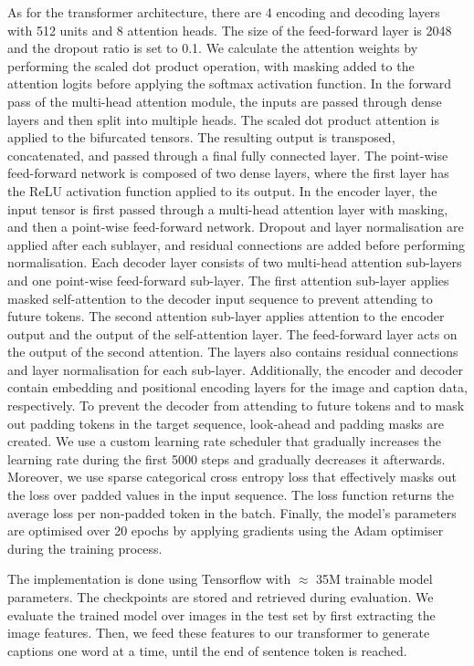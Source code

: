 As for the transformer architecture, there are 4 encoding and decoding layers with 512 units and 8 attention heads. The size of the feed-forward layer is 2048 and the dropout ratio is set to 0.1. We calculate the attention weights by performing the scaled dot product operation, with masking added to the attention logits before applying the softmax activation function. In the forward pass of the multi-head attention module, the inputs are passed through dense layers and then split into multiple heads. The scaled dot product attention is applied to the bifurcated tensors. The resulting output is transposed, concatenated, and passed through a final fully connected layer. The point-wise feed-forward network is composed of two dense layers, where the first layer has the ReLU activation function applied to its output. In the encoder layer, the input tensor is first passed through a multi-head attention layer with masking, and then a point-wise feed-forward network. Dropout and layer normalisation are applied after each sublayer, and residual connections are added before performing normalisation. Each decoder layer consists of two multi-head attention sub-layers and one point-wise feed-forward sub-layer. The first attention sub-layer applies masked self-attention to the decoder input sequence to prevent attending to future tokens. The second attention sub-layer applies attention to the encoder output and the output of the self-attention layer. The feed-forward layer acts on the output of the second attention. The layers also contains residual connections and layer normalisation for each sub-layer. Additionally, the encoder and decoder contain embedding and positional encoding layers for the image and caption data, respectively. To prevent the decoder from attending to future tokens and to mask out padding tokens in the target sequence, look-ahead and padding masks are created. We use a custom learning rate scheduler that gradually increases the learning rate during the first 5000 steps and gradually decreases it afterwards. Moreover, we use sparse categorical cross entropy loss that effectively masks out the loss over padded values in the input sequence. The loss function returns the average loss per non-padded token in the batch. Finally, the model's parameters are optimised over 20 epochs by applying gradients using the Adam optimiser during the training process.

The implementation is done using Tensorflow with $\approx$ 35M trainable model parameters. The checkpoints are stored and retrieved during evaluation. We evaluate the trained model over images in the test set by first extracting the image features. Then, we feed these features to our transformer to generate captions one word at a time, until the end of sentence token is reached. 

